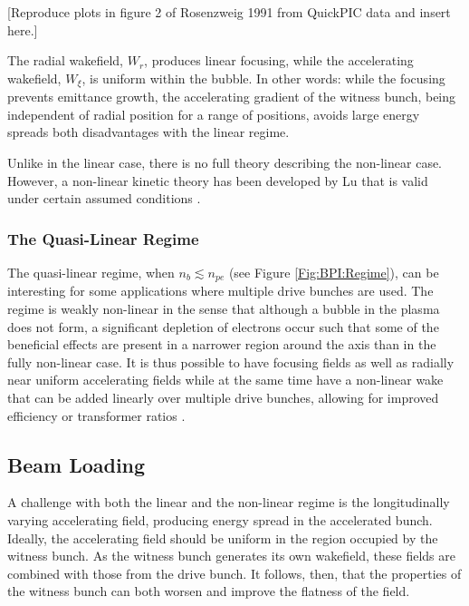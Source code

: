 [Reproduce plots in figure 2 of Rosenzweig 1991 from QuickPIC data and insert here.]

The radial wakefield, $W_{r}$, produces linear focusing, while the accelerating wakefield, $W_{\xi}$, is uniform within the bubble. In other words: while the focusing prevents emittance growth, the accelerating gradient of the witness bunch, being independent of radial position for a range of positions, avoids large energy spreads \dash both disadvantages with the linear regime.

Unlike in the linear case, there is no full theory describing the non-linear case. However, a non-linear kinetic theory has been developed by Lu \etal that is valid under certain assumed conditions \cite{lu:2006a,lu:2006}.

\subsubsection{The Quasi-Linear Regime}
\label{Int:BPI:QLin}

The quasi-linear regime, when $n_{b} \lesssim n_{pe}$ (see Figure \ref{Fig:BPI:Regime}), can be interesting for some applications where multiple drive bunches are used. The regime is weakly non-linear in the sense that although a bubble in the plasma does not form, a significant depletion of electrons occur such that some of the beneficial effects are present in a narrower region around the axis than in the fully non-linear case. It is thus possible to have focusing fields as well as radially near uniform accelerating fields while at the same time have a non-linear wake that can be added linearly over multiple drive bunches, allowing for improved efficiency or transformer ratios \cite{muggli:2017,rosenzweig:2010}.

\subsection{Beam Loading}
\label{Int:BPI:BLoad}

A challenge with both the linear and the non-linear regime is the longitudinally varying accelerating field, producing energy spread in the accelerated bunch. Ideally, the accelerating field should be uniform in the region occupied by the witness bunch. As the witness bunch generates its own wakefield, these fields are combined with those from the drive bunch. It follows, then, that the properties of the witness bunch can both worsen and improve the flatness of the field.

